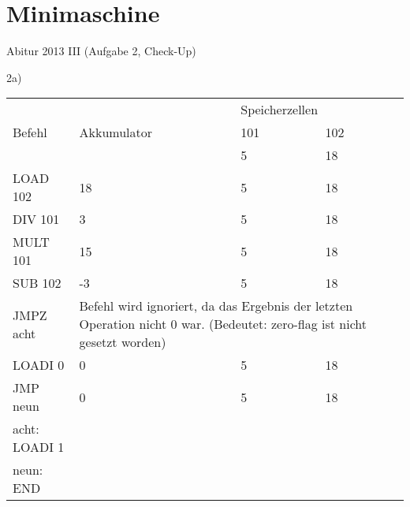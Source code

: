 \documentclass{lehramt-informatik-aufgabe}
\begin{document}
\section{Minimaschine}

Abitur 2013 III (Aufgabe 2, Check-Up)

2a)

\begin{tabular}{llll}
              &                                              & \multicolumn{2}{l}{Speicherzellen}                                                                  \\
Befehl        & Akkumulator                                  & 101                                               & 102                                             \\
              &                                              & 5                                                 & 18                                              \\
LOAD 102      & 18                                           & 5                                                 & 18                                              \\
DIV 101       & 3                                            & 5                                                 & 18                                              \\
MULT 101      & 15                                           & 5                                                 & 18                                              \\
SUB 102       & -3                                           & 5                                                 & 18                                              \\
JMPZ acht     & \multicolumn{3}{l}{Befehl wird ignoriert, da 			das Ergebnis der letzten Operation nicht 0 war. (Bedeutet: 			zero-flag ist nicht gesetzt worden)} \\
LOADI 0       & 0                                            & 5                                                 & 18                                              \\
JMP neun      & 0                                            & 5                                                 & 18                                              \\
acht: LOADI 1 &                                              &                                                   &                                                 \\
neun: END     &                                              &                                                   &
\end{tabular}
\end{document}
